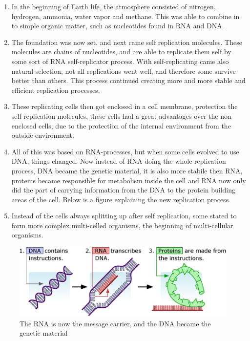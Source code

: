 \begin{enumerate}
  \item In the beginning of Earth life, the atmosphere consisted of nitrogen, hydrogen, ammonia, water vapor and methane. This was able to combine in to simple organic matter, such as nucleotides found in RNA and DNA.
  \item The foundation was now set, and next came self replication molecules. These molecules are chains of nucleotides, and are able to replicate them self by some sort of RNA self-replicator process. With self-replicating came also natural selection, not all replications went well, and therefore some survive better than others. This process continued creating more and more stable and efficient replication processes.
  \item These replicating cells then got enclosed in a cell membrane, protection the self-replication molecules, these cells had a great advantages over the non enclosed cells, due to the protection of the internal environment from the outside environment.
  \item All of this was based on RNA-processes, but when some cells evolved to use DNA, things changed. Now instead of RNA doing the whole replication process, DNA became the genetic material, it is also more stabile then RNA, proteins became responsible for metabolism inside the cell and RNA now only did the part of carrying information from the DNA to the protein building areas of the cell. Below is a figure explaining the new replication process.
  \item Instead of the cells always splitting up after self replication, some stated to form more complex multi-celled organisms, the beginning of multi-cellular organisms.
\end{enumerate}

\begin{figure}[htb]
  \centering
  \includegraphics[width=\textwidth]{figures/Life/dnarnaprotein}
  \caption{The RNA is now the message carrier, and the DNA became the genetic material}
\end{figure}

